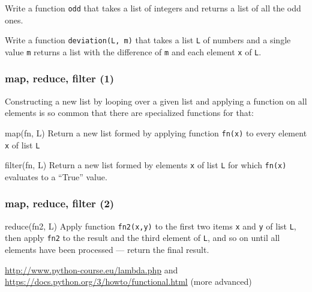 \documentclass[english,serif,mathserif,xcolor=pdftex,dvipsnames,table]{beamer}
\begin{document}
\begin{frame}[fragile]
  \begin{exercise*}[3.B]
    Write a function \texttt{odd} that takes a list of integers and
    returns a list of all the odd ones.
  \end{exercise*}

  \+
  \begin{exercise*}[3.C]
    Write a function \texttt{deviation(L, m)} that takes a list \texttt{L} of
    numbers and a single value \texttt{m} returns a list with the difference of
    \texttt{m} and each element \texttt{x} of \texttt{L}.
  \end{exercise*}
\end{frame}


\begin{frame}
  \frametitle{map, reduce, filter (1)}

  Constructing a new list by looping over a given list and applying a function
  on all elements is so common that there are specialized functions for that:

  \begin{describe}{map(fn, L)}
    Return a new list formed by applying function \texttt{fn(x)} to every
    element \texttt{x} of list \texttt{L}
  \end{describe}

  \+
  \begin{describe}{filter(fn, L)}
    Return a new list formed by elements \texttt{x} of list \texttt{L} for which
    \texttt{fn(x)} evaluates to a ``True'' value.
  \end{describe}
\end{frame}

\begin{frame}
  \frametitle{map, reduce, filter (2)}

  \begin{describe}{reduce(fn2, L)}
    Apply function \texttt{fn2(x,y)} to the first two items \texttt{x} and
    \texttt{y} of list \texttt{L}, then apply \texttt{fn2} to the result and the
    third element of \texttt{L}, and so on until all elements have been
    processed --- return the final result.
  \end{describe}

  \+
  \begin{seealso}
    \url{http://www.python-course.eu/lambda.php}
    and \url{https://docs.python.org/3/howto/functional.html} (more advanced)
  \end{seealso}
\end{frame}
\end{document}
